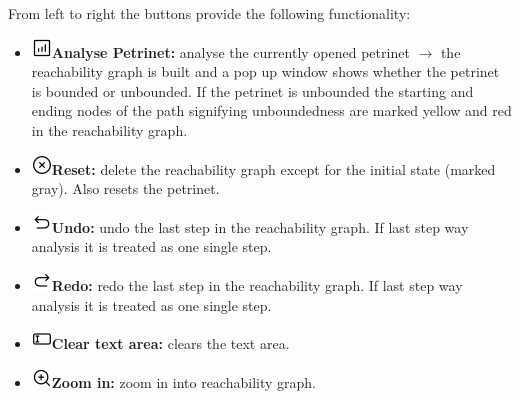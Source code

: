 \documentclass[10pt, a4paper]{article}
\begin{document}
From left to right the buttons provide the following functionality:
\begin{itemize}
\item\includegraphics[scale=0.4]{../resources/images/Toolbar/stats.png}\hspace{0.1cm}\textbf{Analyse Petrinet:} analyse the currently opened petrinet $\rightarrow$ the reachability graph is built and a pop up window shows whether the petrinet is bounded or unbounded. If the petrinet is unbounded the starting and ending nodes of the path signifying unboundedness are marked yellow and red in the reachability graph. 
\item\includegraphics[scale=0.4]{../resources/images/Toolbar/delete.png}\hspace{0.1cm}\textbf{Reset:} delete the reachability graph except for the initial state (marked gray). Also resets the petrinet. 
\item\includegraphics[scale=0.4]{../resources/images/Toolbar/undo.png}\hspace{0.1cm}\textbf{Undo:} undo the last step in the reachability graph. If last step way analysis it is treated as one single step.
\item\includegraphics[scale=0.4]{../resources/images/Toolbar/redo.png}\hspace{0.1cm}\textbf{Redo:} redo the last step in the reachability graph. If last step way analysis it is treated as one single step.
\item\includegraphics[scale=0.4]{../resources/images/Toolbar/input.png}\hspace{0.1cm}\textbf{Clear text area:} clears the text area.
\item\includegraphics[scale=0.4]{../resources/images/Toolbar/zoom-in.png}\hspace{0.1cm}\textbf{Zoom in:} zoom in into reachability graph.

\end{itemize}
\end{document}
